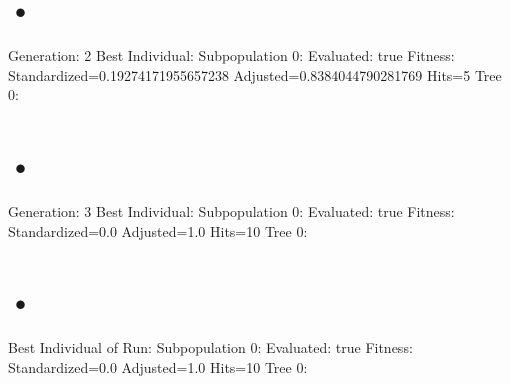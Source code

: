 \documentclass[]{article}
\begin{document}
\vspace{2em}

\section{•}
Generation: 2
Best Individual:
Subpopulation 0:
Evaluated: true
Fitness: Standardized=0.19274171955657238 Adjusted=0.8384044790281769 Hits=5
Tree 0:
\begin{bundle}{\gpbox{+}}\end{bundle}
\vspace{2em}

\section{•}
Generation: 3
Best Individual:
Subpopulation 0:
Evaluated: true
Fitness: Standardized=0.0 Adjusted=1.0 Hits=10
Tree 0:
\begin{bundle}{\gpbox{+}}\end{bundle}
\vspace{2em}

\section{•}
Best Individual of Run:
Subpopulation 0:
Evaluated: true
Fitness: Standardized=0.0 Adjusted=1.0 Hits=10
Tree 0:
\begin{bundle}{\gpbox{+}}\end{bundle}
\end{document}
